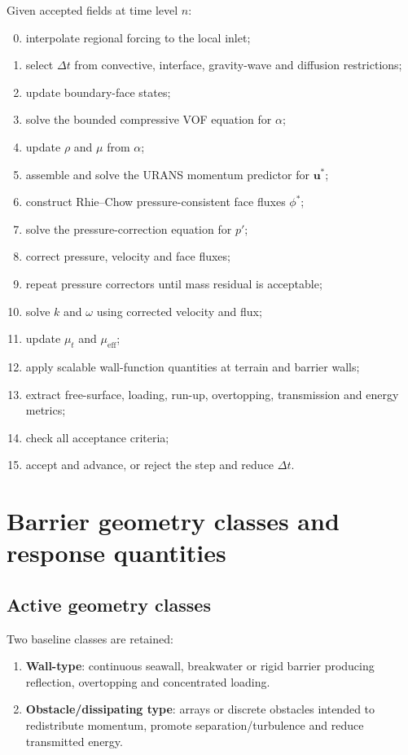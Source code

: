 \documentclass[11pt,a4paper]{article}
\newcommand{\vect}[1]{\bm{#1}}
\begin{document}
Given accepted fields at time level $n$:
\begin{enumerate}[label=\arabic*.]
  \setcounter{enumi}{-1}
  \item interpolate regional forcing to the local inlet;
  \item select $\Delta t$ from convective, interface, gravity-wave and diffusion restrictions;
  \item update boundary-face states;
  \item solve the bounded compressive VOF equation for $\alpha$;
  \item update $\rho$ and $\mu$ from $\alpha$;
  \item assemble and solve the URANS momentum predictor for $\vect u^*$;
  \item construct Rhie--Chow pressure-consistent face fluxes $\phi^*$;
  \item solve the pressure-correction equation for $p'$;
  \item correct pressure, velocity and face fluxes;
  \item repeat pressure correctors until mass residual is acceptable;
  \item solve $k$ and $\omega$ using corrected velocity and flux;
  \item update $\mu_t$ and $\mu_{\mathrm{eff}}$;
  \item apply scalable wall-function quantities at terrain and barrier walls;
  \item extract free-surface, loading, run-up, overtopping, transmission and energy metrics;
  \item check all acceptance criteria;
  \item accept and advance, or reject the step and reduce $\Delta t$.
\end{enumerate}

\section{Barrier geometry classes and response quantities}

\subsection{Active geometry classes}

Two baseline classes are retained:
\begin{enumerate}
  \item \textbf{Wall-type}: continuous seawall, breakwater or rigid barrier producing reflection, overtopping and concentrated loading.
  \item \textbf{Obstacle/dissipating type}: arrays or discrete obstacles intended to redistribute momentum, promote separation/turbulence and reduce transmitted energy.
\end{enumerate}
\end{document}
